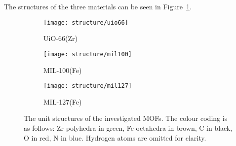 The structures of the three materials can be seen in Figure~\ref{fig:mofstructures}.

\begin{figure}[t]
	\centering
	\begin{subfigure}{0.3\textwidth}
		\texttt{[image: structure/uio66]}
		\caption{UiO-66(Zr)}
	\end{subfigure}
	\begin{subfigure}{0.3\textwidth}
		\texttt{[image: structure/mil100]}
		\caption{MIL-100(Fe)}
	\end{subfigure}
	\begin{subfigure}{0.3\textwidth}
		\texttt{[image: structure/mil127]}
		\caption{MIL-127(Fe)}
	\end{subfigure}

	\caption{The unit structures of the investigated MOFs.
		The colour coding is as follows: Zr polyhedra in green,
		Fe octahedra in brown, C in black, O in red, N in blue.
		Hydrogen atoms are omitted for clarity.}
	\label{fig:mofstructures}
\end{figure}